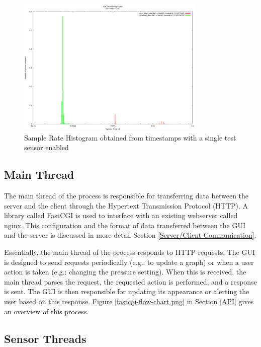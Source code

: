 \begin{figure}[H]
	\centering
	\includegraphics[width=0.8\textwidth]{figures/sample_rate_histogram.png}
	\caption{Sample Rate Histogram obtained from timestamps with a single test sensor enabled}
	\label{sample_rate_histogram.png}
\end{figure}


\subsection{Main Thread}\label{Main Thread}

The main thread of the process is responsible for transferring data between the server and the client through the Hypertext Transmission Protocol (HTTP). A library called FastCGI is used to interface with an existing webserver called nginx\cite{nginx}. This configuration and the format of data transferred between the GUI and the server is discussed in more detail Section \ref{Server/Client Communication}.

Essentially, the main thread of the process responds to HTTP requests. The GUI is designed to send requests periodically (e.g.: to update a graph) or when a user action is taken (e.g.: changing the pressure setting). When this is received, the main thread parses the request, the requested action is performed, and a response is sent. The GUI is then responsible for updating its appearance or alerting the user based on this response. Figure \ref{fastcgi-flow-chart.png} in Section \ref{API} gives an overview of this process.


\subsection{Sensor Threads}\label{Sensor Thread}

